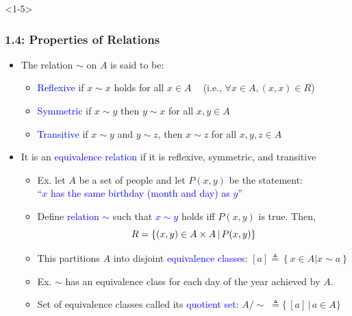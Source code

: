\documentclass[10pt,english,aspectratio=169]{beamer}
\begin{document}
\begin{frame}<1-5> \frametitle{1.4: Properties of Relations}

\begin{itemize}
\setlength\itemsep{5mm}
\item<1-> The relation $\sim$ on $A$ is said to be: \vspace{1mm}
\begin{itemize}
  \setlength\itemsep{1.5mm}
  \item \textcolor{blue}{Reflexive} if $x\sim x$ holds for all $x\in A$ $\;\;$ (i.e., $\forall x\in A, (x,x) \in R$)
  \item \textcolor{blue}{Symmetric} if $x\sim y$ then $y\sim x$ for all $x,y\in A$
  \item \textcolor{blue}{Transitive} if $x\sim y$ and $y\sim z$, then $x\sim z$ for all $x,y,z\in A$
\end{itemize}

\item<2-> It is an \textcolor{blue}{equivalence relation} if it is reflexive, symmetric, and transitive \vspace{1mm}

\begin{itemize}
  \setlength\itemsep{1.5mm}
  \item Ex. let $A$ be a set of people and let $P(x,y)$ be the statement: \\ \textcolor{blue}{``$x$ has the same birthday (month and day) as $y$''}
  \item Define \textcolor{blue}{relation $\sim$} such that \textcolor{blue}{$x\sim y$} holds iff $P(x,y)$ is true.  Then, \vspace{-1mm}
  \[ R = \{ (x,y)\in A\times A \,|\, P(x,y) \} \vspace*{-1mm} \]
  \item<3-> This partitions $A$ into disjoint \textcolor{blue}{equivalence classes}: $[a] \triangleq \left\{x\in A | x \sim a\right\}$
  \item<4-> Ex. $\sim$ has an equivalence class for each day of the year achieved by $A$.
  \item<5-> Set of equivalence classes called its \textcolor{blue}{quotient set}: $A / \!\sim \;\triangleq \{ \, [a] \, | \, a\in A \}\!\!\!\!\!$

\end{itemize}
\end{itemize}


\end{frame}
\end{document}
